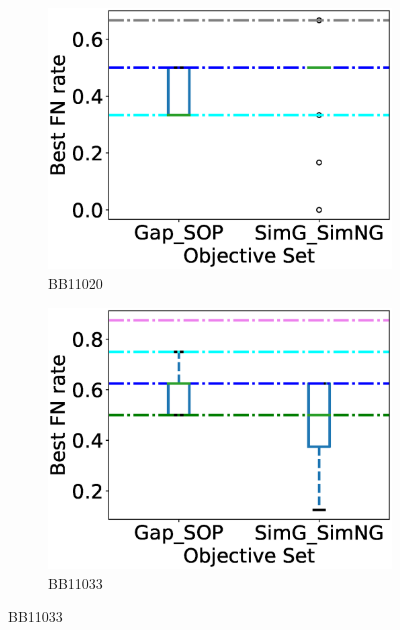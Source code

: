\begin{figure}[!htbp]
\begin{adjustwidth}{-1cm}{-1cm}
\begin{subfigure}{0.26\textwidth}
			\includegraphics[width=\columnwidth]{Figure/summary/precomputedInit/Balibase/BB11020_objset_fnrate_rank}
			\caption{BB11020}
\end{subfigure}
\begin{subfigure}{0.26\textwidth}
			\includegraphics[width=\columnwidth]{Figure/summary/precomputedInit/Balibase/BB11033_objset_fnrate_rank}
			\caption{BB11033}
\end{subfigure}
		

\end{adjustwidth}
\end{figure}
